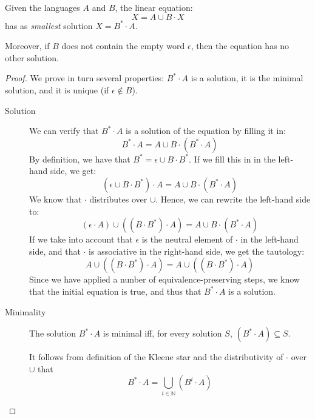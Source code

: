 \begin{theorem}
Given the languages $A$ and $B$, the linear equation:
\begin{equation*}
X = A \cup B \cdot X
\end{equation*}
has as \emph{smallest} solution $X = B^* \cdot A$. 

Moreover, if $B$ does not contain the empty word $\epsilon$, then the equation
has no other solution.
\end{theorem}
\begin{proof}

We prove in turn several properties: $B^*\cdot A$ is a solution, it is the minimal
solution, and it is unique (if $\epsilon \not\in B$).
\begin{description}
\item[Solution]
We can verify that $B^* \cdot A$ is a solution of the equation by filling it in:
\begin{equation*}
B^* \cdot A = A \cup B \cdot (B^* \cdot A)
\end{equation*}
By definition, we have that $B^* = \epsilon \cup B \cdot B^*$. If we fill this
in in the left-hand side, we get:
\begin{equation*}
(\epsilon \cup B \cdot B^*) \cdot A = A \cup B \cdot (B^* \cdot A)
\end{equation*}
We know that $\cdot$ distributes over $\cup$. Hence, we can rewrite the left-hand
side to:
\begin{equation*}
(\epsilon \cdot A) \cup ((B \cdot B^*) \cdot A) = A \cup B \cdot (B^* \cdot A)
\end{equation*}
If we take into account that $\epsilon$ is the neutral element of $\cdot$ in the left-hand
side, and that $\cdot$ is associative in the right-hand side, we get the tautology:
\begin{equation*}
A \cup ((B \cdot B^*) \cdot A) = A \cup ((B \cdot B^*) \cdot A)
\end{equation*}
Since we have applied a nunber of equivalence-preserving steps, we know that the initial
equation is true, and thus that $B^* \cdot A$ is a solution.

\item[Minimality]
  The solution $B^* \cdot A$ is minimal iff, for every solution $S$, $(B^* \cdot A) \subseteq S$.

  It follows from definition of the Kleene star and the distributivity of $\cdot$ over $\cup$ that
  \begin{equation*}
   B^* \cdot A = \bigcup_{i \in \mathbb{N}} (B^i \cdot A)
 \end{equation*}


\end{description}
\end{proof}
